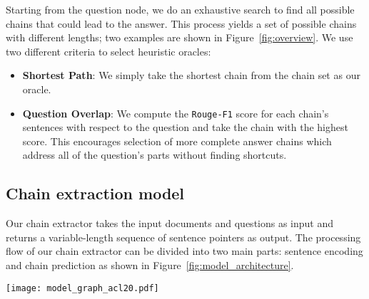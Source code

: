 \documentclass[11pt,a4paper]{article}
\begin{document}
Starting from the question node, we do an exhaustive search to find all possible chains that could lead to the answer. This process yields a set of possible chains with different lengths; two examples are shown in Figure~\ref{fig:overview}. We use two different criteria to select heuristic oracles:
\begin{itemize}
    \item \textbf{Shortest Path}: We simply take the shortest chain from the chain set as our oracle.
    \item \textbf{Question Overlap}: We compute the \texttt{Rouge-F1} score for each chain's sentences with respect to the question and take the chain with the highest score. This encourages selection of more complete answer chains which address all of the question's parts without finding shortcuts. 
\end{itemize}





\subsection{Chain extraction model}

Our chain extractor takes the input documents and questions as input and returns a variable-length sequence of sentence pointers as output. The processing flow of our chain extractor can be divided into two main parts: sentence encoding and chain prediction as shown in Figure~\ref{fig:model_architecture}.

\begin{figure*}[t]
\centering
\texttt{[image: model\_graph\_acl20.pdf]}
\caption{The BERT-Para variant of our proposed chain extractor. Left side: we encode each document paragraph jointly with the question and use pooling to form sentence representations. Right side: we use a pointer network extracts a sequence of sentences.}
\vspace{-0.5cm}
    \label{fig:model_architecture}
\end{figure*}
\end{document}
